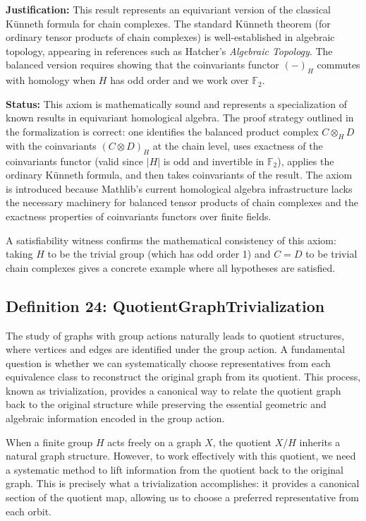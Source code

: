 \documentclass[11pt]{article}
\theoremstyle{plain}
\theoremstyle{definition}
\theoremstyle{remark}
\begin{document}
\textbf{Justification:} This result represents an equivariant version of the classical Künneth formula for chain complexes. The standard Künneth theorem (for ordinary tensor products of chain complexes) is well-established in algebraic topology, appearing in references such as Hatcher's \textit{Algebraic Topology}. The balanced version requires showing that the coinvariants functor $(-)_H$ commutes with homology when $H$ has odd order and we work over $\mathbb{F}_2$.

\textbf{Status:} This axiom is mathematically sound and represents a specialization of known results in equivariant homological algebra. The proof strategy outlined in the formalization is correct: one identifies the balanced product complex $C \otimes_H D$ with the coinvariants $(C \otimes D)_H$ at the chain level, uses exactness of the coinvariants functor (valid since $|H|$ is odd and invertible in $\mathbb{F}_2$), applies the ordinary Künneth formula, and then takes coinvariants of the result. The axiom is introduced because Mathlib's current homological algebra infrastructure lacks the necessary machinery for balanced tensor products of chain complexes and the exactness properties of coinvariants functors over finite fields.

A satisfiability witness confirms the mathematical consistency of this axiom: taking $H$ to be the trivial group (which has odd order 1) and $C = D$ to be trivial chain complexes gives a concrete example where all hypotheses are satisfied.

\vspace{1em}

\subsection{Definition 24: QuotientGraphTrivialization}

The study of graphs with group actions naturally leads to quotient structures, where vertices and edges are identified under the group action. A fundamental question is whether we can systematically choose representatives from each equivalence class to reconstruct the original graph from its quotient. This process, known as trivialization, provides a canonical way to relate the quotient graph back to the original structure while preserving the essential geometric and algebraic information encoded in the group action.

When a finite group $H$ acts freely on a graph $X$, the quotient $X/H$ inherits a natural graph structure. However, to work effectively with this quotient, we need a systematic method to lift information from the quotient back to the original graph. This is precisely what a trivialization accomplishes: it provides a canonical section of the quotient map, allowing us to choose a preferred representative from each orbit.
\end{document}
